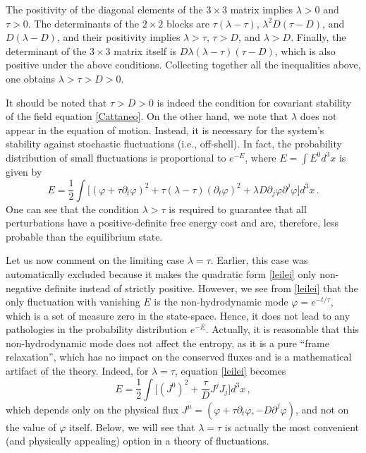 \documentclass[a4paper, amsfonts, amssymb, amsmath, reprint, showkeys, nofootinbib, twoside,notitlepage,onecolumn,preprintnumbers]{revtex4-2}
\theoremstyle{definition}
\theoremstyle{theorem}
\theoremstyle{corollary}
\begin{document}
The positivity of the diagonal elements of the $3 \times 3 $ matrix implies $\lambda>0$ and $\tau>0$. The  determinants of the $2\times 2$ blocks are $\tau(\lambda-\tau)$, $\lambda^2 D(\tau-D)$, and $D(\lambda-D)$, and their positivity implies $\lambda>\tau$, $\tau>D$, and $\lambda>D$. Finally, the determinant of the $3 \times 3$ matrix itself is $D\lambda (\lambda-\tau)(\tau-D)$, which is also positive under the above conditions. Collecting together all the inequalities above, one obtains $\lambda>\tau>D>0$.

It should be noted that $\tau>D>0$ is indeed the condition for covariant stability of the field equation \eqref{Cattaneo}. On the other hand, we note that $\lambda$ does not appear in the equation of motion. Instead, it is necessary for the system's stability against stochastic fluctuations (i.e., off-shell). In fact, the probability distribution of small fluctuations is proportional to $e^{-E}$, where $E=\int E^0 d^3 x$ is given by
\begin{equation}\label{leilei}
E= \dfrac{1}{2} \int  \bigg[ (\varphi+\tau \partial_t \varphi)^2 + \tau(\lambda -\tau) (\partial_t \varphi)^2+ \lambda D \partial_j \varphi \partial^j \varphi \bigg] d^3 x \, .
\end{equation} 
One can see that the condition $\lambda>\tau$ is required to guarantee that all perturbations have a positive-definite free energy cost and are, therefore, less probable than the equilibrium state.

Let us now comment on the limiting case $\lambda =\tau$. Earlier, this case was automatically excluded because it makes the quadratic form \eqref{leilei} only non-negative definite instead of strictly positive. However, we see from \eqref{leilei} that the only fluctuation with vanishing $E$ is the non-hydrodynamic mode $\varphi=e^{-t/\tau}$, which is a set of measure zero in the state-space. Hence, it does not lead to any pathologies in the probability distribution $e^{-E}$. Actually, it is reasonable that this non-hydrodynamic mode does not affect the entropy, as it is a pure ``frame relaxation'', which has no impact on the conserved fluxes and is a mathematical artifact of the theory.  Indeed, for $\lambda=\tau$, equation \eqref{leilei} becomes
\begin{equation}\label{leilei2}
E= \dfrac{1}{2} \int  \bigg[ (J^0)^2 +  \dfrac{\tau}{D} J^j J_j \bigg] d^3 x \, ,
\end{equation} 
which depends only on the physical flux $J^\mu=(\varphi+\tau \partial_t \varphi,-D\partial^j \varphi)$, and not on the value of $\varphi$ itself. Below, we will see that $\lambda=\tau$ is actually the most convenient (and physically appealing) option in a theory of fluctuations.
\end{document}
